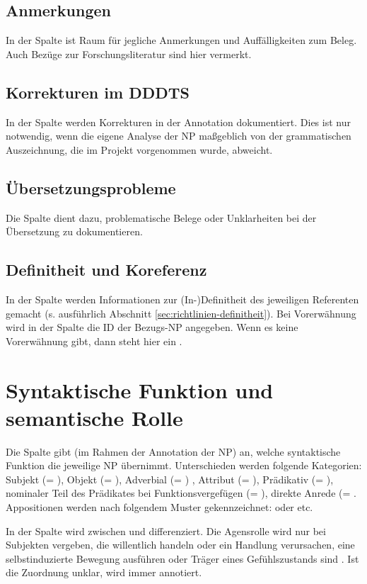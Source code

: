 \subsection{Anmerkungen} 
In der Spalte  ist Raum für jegliche Anmerkungen und Auffälligkeiten zum Beleg. Auch Bezüge zur Forschungsliteratur sind hier vermerkt.

\subsection{Korrekturen im DDDTS} 

In der Spalte  werden Korrekturen in der Annotation dokumentiert. Dies ist nur notwendig, wenn die eigene Analyse der NP maßgeblich von der grammatischen Auszeichnung, die im Projekt vorgenommen wurde, abweicht. 

\subsection{Übersetzungsprobleme} 
Die Spalte  dient dazu, problematische Belege oder Unklarheiten bei der Übersetzung zu dokumentieren. 
  
\subsection{Definitheit und Koreferenz} 

In der Spalte  werden Informationen zur (In-)Definitheit des jeweiligen Referenten gemacht (s. ausführlich Abschnitt \ref{sec:richtlinien-definitheit}). Bei Vorerwähnung wird in der Spalte  die ID der Bezugs-NP angegeben. Wenn es keine Vorerwähnung gibt, dann steht hier ein .


\section{Syntaktische Funktion und semantische Rolle} \label{sec:richtlinien-semantische-rolle}

Die Spalte  gibt (im Rahmen der Annotation der NP) an, welche syntaktische Funktion die jeweilige NP übernimmt. Unterschieden werden folgende Kategorien: Subjekt (= ), Objekt (= ), Adverbial (= )%
, Attribut (= ), Prädikativ (= ), nominaler Teil des Prädikates bei Funktionsvergefügen (= ), direkte Anrede (= . Appositionen werden nach folgendem Muster gekennzeichnet:  oder  etc. 

In der Spalte  wird zwischen  und  differenziert. Die Agensrolle wird nur bei Subjekten vergeben, die willentlich handeln oder ein Handlung verursachen, eine selbstinduzierte Bewegung ausführen oder Träger eines Gefühlszustands sind \parencite[gemäß den Proto-Agensdimensionen in][]{Dowty1991,Primus2012}. Ist die Zuordnung unklar, wird immer  annotiert. 
 
